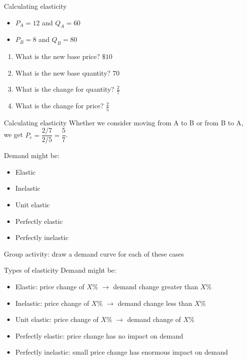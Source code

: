 \documentclass[aspectratio=169]{beamer}
\begin{document}
\begin{frame}{Calculating elasticity}
    \begin{itemize}
        \item $P_A=12$ and $Q_A=60$
        \item $P_B=8$ and $Q_B=80$
    \end{itemize}
    
    \begin{enumerate}
        \item What is the new base price? $\$10$
        \item What is the new base quantity? $70$
        \item What is the change for quantity? $\frac{2}{7}$
        \item What is the change for price? $\frac{2}{5}$
    \end{enumerate}
\end{frame}

\begin{frame}{Calculating elasticity}
   Whether we consider moving from A to B or from B to A, we get $P_e = \dfrac{2/7}{2/5} = \dfrac{5}{7}$.

   \medskip

   Demand might be:
   \begin{itemize}
    \item Elastic
    \item Inelastic
    \item Unit elastic
    \item Perfectly elastic
    \item Perfectly inelastic
   \end{itemize}

   Group activity: draw a demand curve for each of these cases
\end{frame}

\begin{frame}{Types of elasticity}
    Demand might be:
    \begin{itemize}
     \item Elastic: price change of $X\%$ $\to$ demand change greater than $X\%$ 
     \item Inelastic: price change of $X\%$ $\to$ demand change less than $X\%$ 
     \item Unit elastic: price change of $X\%$ $\to$ demand change of $X\%$
     \item Perfectly elastic: price change has no impact on demand
     \item Perfectly inelastic: small price change has enormous impact on demand
    \end{itemize}
 \end{frame}
\end{document}
